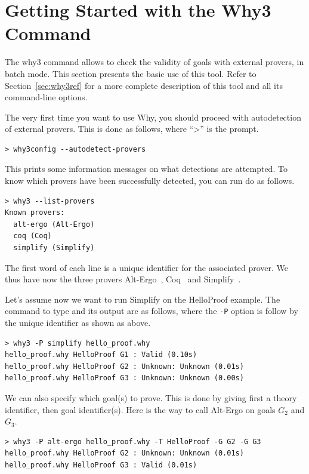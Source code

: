 \section{Getting Started with the Why3 Command}
\label{sec:batch}

The why3 command allows to check the validity of goals with external
provers, in batch mode. This section presents the basic use of this
tool. Refer to Section~\ref{sec:why3ref} for a more complete
description of this tool and all its command-line options.

The very first time you want to use Why, you should proceed with
autodetection of external provers. This is done as follows, where ``>'' is the prompt.
\begin{verbatim}
> why3config --autodetect-provers
\end{verbatim}
This prints some information messages on what detections are attempted. To know which
provers have been successfully detected, you can run do as follows.
\begin{verbatim}
> why3 --list-provers
Known provers:
  alt-ergo (Alt-Ergo)
  coq (Coq)
  simplify (Simplify)
\end{verbatim}
The first word of each line is a unique identifier for the associated prover. We thus
have now the three provers Alt-Ergo~\cite{ergo}, Coq~\cite{CoqArt} and
Simplify~\cite{simplify05}. 

Let's assume now we want to run Simplify on the HelloProof
example. The command to type and its output are as follows, where the
\verb|-P| option is follow by the unique identifier as shown as above.
\begin{verbatim}
> why3 -P simplify hello_proof.why
hello_proof.why HelloProof G1 : Valid (0.10s)
hello_proof.why HelloProof G2 : Unknown: Unknown (0.01s)
hello_proof.why HelloProof G3 : Unknown: Unknown (0.00s)
\end{verbatim}

We can also specify which goal(s) to prove. This is done by giving
first a theory identifier, then goal identifier(s). Here is the way to
call Alt-Ergo on goals $G_2$ and $G_3$.
\begin{verbatim}
> why3 -P alt-ergo hello_proof.why -T HelloProof -G G2 -G G3
hello_proof.why HelloProof G2 : Unknown: Unknown (0.01s)
hello_proof.why HelloProof G3 : Valid (0.01s)
\end{verbatim}

